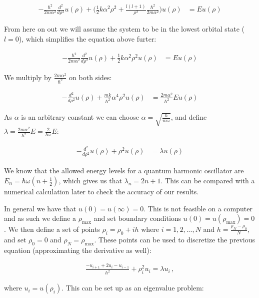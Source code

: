 \documentclass[reprint,english,notitlepage]{revtex4-1}  %
\begin{document}
\begin{align*}
-\frac{\hbar^2}{2m\alpha^2} \frac{d^2}{d\rho^2} u(\rho) + \bigg( \frac{1}{2}k\alpha^2 \rho^2 + \frac{l(l+1)}{\rho^2} \frac{\hbar^2}{2m\alpha^2} \bigg) u(\rho) &= Eu(\rho) 
\end{align*}

From here on out we will assume the system to be in the lowest orbital state ($l=0$), which simplifies the equation above furter:

\begin{align*}
-\frac{\hbar^2}{2m\alpha^2} \frac{d^2}{d\rho^2} u(\rho) + \frac{1}{2}k\alpha^2 \rho^2 u(\rho) &= Eu(\rho) 
\end{align*}

We multiply by $\frac{2m\alpha^2}{\hbar^2}$ on both sides:

\begin{align*}
-\frac{d^2}{d\rho^2} u(\rho) + \frac{mk}{\hbar^2}\alpha^4 \rho^2 u(\rho) &= \frac{2m\alpha^2}{\hbar^2} Eu(\rho) 
\end{align*}

As $\alpha$ is an arbitrary constant we can choose $\alpha = \sqrt{\frac{\hbar}{m \omega}}$, and define $\lambda = \frac{2m\alpha^2}{\hbar^2} E = \frac{2}{\hbar \omega} E$:

\begin{align*}
-\frac{d^2}{d\rho^2} u(\rho) + \rho^2 u(\rho) &= \lambda u(\rho) 
\end{align*}

We know that the allowed energy levels for a quantum harmonic oscillator are $E_n = \hbar \omega (n + \frac{1}{2})$, which gives us that $\lambda_n = 2n+1$. This can be compared with a numerical calculation later to check the accuracy of our results.
 
In general we have that $u(0) = u(\infty) = 0$. This is not feasible on a computer and as such we define a $\rho_{\text{max}}$ and set boundary conditions $u(0) = u(\rho_{\text{max}}) = 0$. We then define a set of points $\rho_i = \rho_0 + ih$ where $i = 1,2,...,N$ and $h = \frac{\rho_N - \rho_0}{N}$, and set $\rho_0 = 0$ and $\rho_N  = \rho_{\text{max}}$. These points can be used to discretize the previous equation (approximating the derivative as well):

\begin{align*}
\frac{-u_{i+1} + 2u_i - u_{i-1}}{h^2} + \rho_i^2 u_i = \lambda u_i \, ,
\end{align*}

where $u_i = u(\rho_i)$. This can be set up as an eigenvalue problem:
\end{document}
